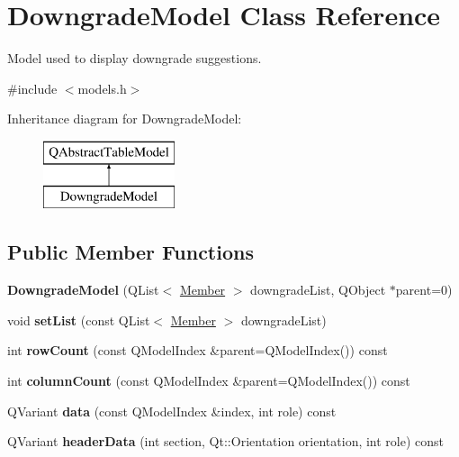 \hypertarget{class_downgrade_model}{}\section{Downgrade\+Model Class Reference}
\label{class_downgrade_model}


Model used to display downgrade suggestions.  




{\ttfamily \#include $<$models.\+h$>$}

Inheritance diagram for Downgrade\+Model\+:\begin{figure}[H]
\begin{center}
\leavevmode
\includegraphics[height=2.000000cm]{class_downgrade_model}
\end{center}
\end{figure}
\subsection*{Public Member Functions}
\begin{DoxyCompactItemize}
\item 
\mbox{\label{class_downgrade_model_a8640247d983498fde9d6169e92957491}} 
{\bfseries Downgrade\+Model} (Q\+List$<$ \mbox{\hyperlink{class_member}{Member}} $>$ downgrade\+List, Q\+Object $\ast$parent=0)
\item 
\mbox{\label{class_downgrade_model_ad6bfff9e9b1407b8524bad353245b2f8}} 
void {\bfseries set\+List} (const Q\+List$<$ \mbox{\hyperlink{class_member}{Member}} $>$ downgrade\+List)
\item 
\mbox{\label{class_downgrade_model_af1860c92859bc05b22e6d067e382a385}} 
int {\bfseries row\+Count} (const Q\+Model\+Index \&parent=Q\+Model\+Index()) const
\item 
\mbox{\label{class_downgrade_model_a5fcfa063673940807668e71a76d9551a}} 
int {\bfseries column\+Count} (const Q\+Model\+Index \&parent=Q\+Model\+Index()) const
\item 
\mbox{\label{class_downgrade_model_a1cedac1e27021c3ef67c13261332d167}} 
Q\+Variant {\bfseries data} (const Q\+Model\+Index \&index, int role) const
\item 
\mbox{\label{class_downgrade_model_abb6c7add0e5965a0f5391a7f0ab35cf8}} 
Q\+Variant {\bfseries header\+Data} (int section, Qt\+::\+Orientation orientation, int role) const
\end{DoxyCompactItemize}

